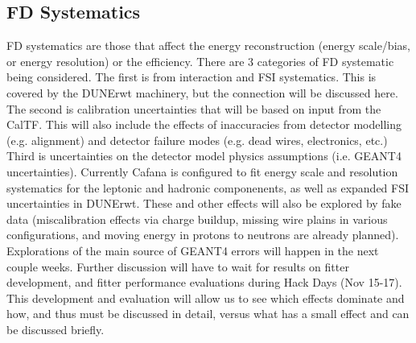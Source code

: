 \subsection{FD Systematics}
FD systematics are those that affect the energy reconstruction (energy scale/bias, or energy resolution) or the efficiency. There are 3 categories of FD systematic being considered. The first is from interaction and FSI systematics. This is covered by the DUNErwt machinery, but the connection will be discussed here. The second is calibration uncertainties that will be based on input from the CalTF. This will also include the effects of inaccuracies from detector modelling (e.g. alignment) and detector failure modes (e.g. dead wires, electronics, etc.) Third is uncertainties on the detector model physics assumptions (i.e. GEANT4 uncertainties).  Currently Cafana is configured to fit energy scale and resolution systematics for the leptonic and hadronic componenents, as well as expanded FSI uncertainties in DUNErwt. These and other effects will also be explored by fake data (miscalibration effects via charge buildup, missing wire plains in various configurations, and moving energy in protons to neutrons are already planned). Explorations of the main source of GEANT4 errors will happen in the next couple weeks. Further discussion will have to wait for results on fitter development, and fitter performance evaluations during
Hack Days (Nov 15-17). This development and evaluation will allow us to see which effects dominate and how, and thus must be discussed in detail, versus what has a small effect and can be discussed briefly.





